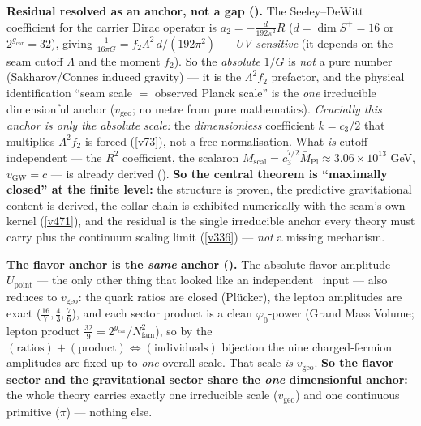 \documentclass[11pt,a4paper]{article}
\newcommand{\cthree}{c_3}
\newcommand{\phiz}{\varphi_0}
\newcommand{\gcar}{g_{\mathrm{car}}}
\newcommand{\Nfam}{N_{\mathrm{fam}}}
\begin{document}
\begin{gapbox}
\smallskip\noindent\textbf{Residual resolved as an anchor, not a gap ().}
The Seeley--DeWitt coefficient for the carrier Dirac operator is $a_2=-\tfrac{d}{192\pi^2}R$ ($d=\dim S^+=16$
or $2^{\gcar}=32$), giving $\tfrac1{16\pi G}=f_2\Lambda^2\,d/(192\pi^2)$ --- \emph{UV-sensitive} (it depends on
the seam cutoff $\Lambda$ and the moment $f_2$). So the \emph{absolute} $1/G$ is \emph{not} a pure number
(Sakharov/Connes induced gravity) --- it is the $\Lambda^2 f_2$ prefactor, and the physical identification
``seam scale $=$ observed Planck scale'' is the \emph{one} irreducible dimensionful anchor
($v_{\mathrm{geo}}$; no metre from pure mathematics). \emph{Crucially this anchor is only the absolute scale:}
the \emph{dimensionless} coefficient $k=\cthree/2$ that multiplies $\Lambda^2 f_2$ is forced (\vref{v73}), not a free
normalisation. What \emph{is} cutoff-independent --- the $R^2$
coefficient, the scalaron $M_{\mathrm{scal}}=\cthree^{7/2}\bar M_{\mathrm{Pl}}\approx3.06\times10^{13}$ GeV,
$v_{\mathrm{GW}}=c$ --- is already derived (). \textbf{So the central theorem
is ``maximally closed'' at the finite level:} the structure is proven, the predictive gravitational content is
derived, the collar chain is exhibited numerically with the seam's own kernel (\vref{v471}), and the residual
is the single irreducible anchor every theory must carry plus the continuum scaling limit (\vref{v336}) ---
\emph{not} a missing mechanism.

\smallskip\noindent\textbf{The flavor anchor is the \emph{same} anchor ().} The
absolute flavor amplitude $U_{\mathrm{point}}$ --- the only other thing that looked like an independent
\mO\ input --- also reduces to $v_{\mathrm{geo}}$: the quark ratios are closed (Pl\"ucker), the lepton
amplitudes are exact ($\tfrac{16}7,\tfrac43,\tfrac76$), and each sector product is a clean $\phiz$-power
(Grand Mass Volume; lepton product $\tfrac{32}9=2^{\gcar}/\Nfam^2$), so by the
$(\text{ratios})+(\text{product})\Leftrightarrow(\text{individuals})$ bijection the nine charged-fermion
amplitudes are fixed up to \emph{one} overall scale. That scale \emph{is} $v_{\mathrm{geo}}$. \textbf{So the
flavor sector and the gravitational sector share the \emph{one} dimensionful anchor:} the whole theory carries
exactly one irreducible scale ($v_{\mathrm{geo}}$) and one continuous primitive ($\pi$) --- nothing else.


\end{gapbox}
\end{document}
